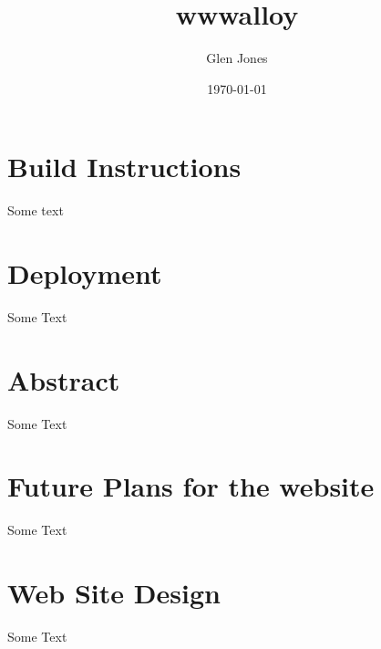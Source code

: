 \documentclass[11pt]{article}
\author{Glen Jones}
\date{\today}
\title{wwwalloy}
\begin{document}
\maketitle
\tableofcontents


\section{Build Instructions}
\label{sec:orgb153bc0}
Some text
\section{Deployment}
\label{sec:org084f123}
Some Text
\section{Abstract}
\label{sec:org3ed2302}
Some Text
\section{Future Plans for the website}
\label{sec:orgeb8e23f}
Some Text
\section{Web Site Design}
\label{sec:org9670642}
Some Text
\end{document}
